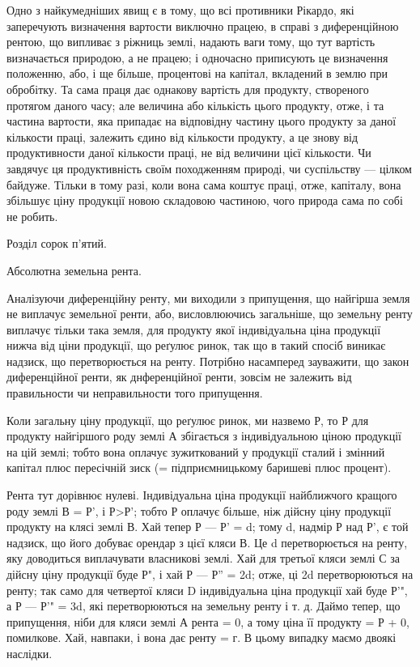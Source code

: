 Одно з найкумедніших явищ є в тому, що всі противники Рікардо, які
заперечують визначення вартости виключно працею, в справі з диференційною
рентою, що випливає з ріжниць землі, надають ваги тому, що тут вартість
визначається природою, а не працею; і одночасно приписують це визначення
положенню, або, і ще більше, процентові на капітал, вкладений в землю при
обробітку. Та сама праця дає однакову вартість для продукту, створеного
протягом даного часу; але величина або кількість цього продукту, отже, і та
частина вартости, яка припадає на відповідну частину цього продукту за даної
кількости праці, залежить єдино від кількости продукту, а це знову від продуктивности
даної кількости праці, не від величини цієї кількости. Чи завдячує
ця продуктивність своїм походженням природі, чи суспільству — цілком байдуже.
Тільки в тому разі, коли вона сама коштує праці, отже, капіталу, вона
збільшує ціну продукції новою складовою частиною, чого природа сама по собі
не робить.

Розділ сорок п'ятий.

Абсолютна земельна рента.

Аналізуючи диференційну ренту, ми виходили з припущення, що найгірша
земля не виплачує земельної ренти, або, висловлюючись загальніше, що земельну
ренту виплачує тільки така земля, для продукту якої індивідуальна ціна продукції
нижча від ціни продукції, що реґулює ринок, так що в такий спосіб
виникає надзиск, що перетворюється на ренту. Потрібно насамперед зауважити,
що закон диференційної ренти, як днференційної ренти, зовсім не залежить від
правильности чи неправильности того припущення.

Коли загальну ціну продукції, що реґулює ринок, ми назвемо Р, то Р для
продукту найгіршого роду землі А збігається з індивідуальною ціною продукції
на цій землі; тобто вона оплачує зужиткований у продукції сталий і змінний капітал
плюс пересічній зиск (= підприємницькому баришеві плюс процент).

Рента тут дорівнює нулеві. Індивідуальна ціна продукції найближчого
кращого роду землі В = Р', і Р>Р'; тобто Р оплачує більше, ніж дійсну
ціну продукції продукту на клясі землі В. Хай тепер Р — Р' = d; тому
d, надмір Р над Р', є той надзиск, що його добуває орендар з цієї кляси В.
Це d перетворюється на ренту, яку доводиться виплачувати власникові землі.
Хай для третьої кляси землі С за дійсну ціну продукції буде Р", і хай Р —
Р'' = 2d; отже, ці 2d перетворюються на ренту; так само для четвертої кляси
D індивідуальна ціна продукції хай буде Р'", а Р — Р'" = 3d, які перетворюються
на земельну ренту і т. д. Даймо тепер, що припущення, ніби для
кляси землі А рента = 0, а тому ціна її продукту = Р + 0, помилкове. Хай,
навпаки, і вона дає ренту = г. В цьому випадку маємо двоякі наслідки.

